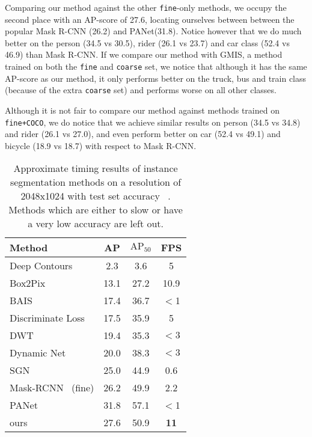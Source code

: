 Comparing our method against the other \texttt{fine}-only methods, we occupy the second place with an AP-score of 27.6, locating ourselves between between the popular Mask R-CNN (26.2) and PANet(31.8). Notice however that we do much better on the person (34.5 vs 30.5), rider (26.1 vs 23.7) and car class (52.4 vs 46.9) than Mask R-CNN. If we compare our method with GMIS, a method trained on both the \texttt{fine} and \texttt{coarse} set, we notice that although it has the same AP-score as our method, it only performs better on the truck, bus and train class (because of the extra \texttt{coarse} set) and performs worse on all other classes. 

Although it is not fair to compare our method against methods trained on \texttt{fine+COCO}, we do notice that we achieve similar results on person (34.5 vs 34.8) and rider (26.1 vs 27.0), and even perform better on car (52.4 vs 49.1) and bicycle (18.9 vs 18.7) with respect to Mask R-CNN.

\begin{table}
    \small
    \centering
    \begin{tabular}{l|c|c|c}
        Method & AP & $\text{AP}_{50}$ & FPS \\
        \hline 
        Deep Contours~\cite{van2016instance}     & 2.3  & 3.6  & 5 \\
        Box2Pix~\cite{uhrig2018box2pix}          & 13.1 & 27.2 & 10.9 \\
        BAIS~\cite{hayder2017boundary}           & 17.4 & 36.7 & $<$1 \\
        Discriminate Loss~\cite{de2017semantic}  & 17.5 & 35.9 & 5 \\
        DWT~\cite{bai2017deep}                   & 19.4 & 35.3 & $<3$ \\
        Dynamic Net~\cite{arnab2017pixelwise}    & 20.0 & 38.3 & $<3$ \\
        SGN~\cite{liu2017sgn}                    & 25.0 & 44.9 & 0.6 \\
        Mask-RCNN~\cite{he2017mask} (fine)       & 26.2 & 49.9 & 2.2 \\
        PANet~\cite{liu2018path}                 & 31.8 & 57.1 & $<$1 \\
        \hline
        ours                                     & 27.6 & 50.9 & \textbf{11} \\
    \end{tabular}
    \vspace{3mm}
    \caption{Approximate timing results of instance segmentation methods on a resolution of 2048x1024 with test set accuracy ~\cite{uhrig2018box2pix}. Methods which are either to slow or have a very low accuracy are left out.}
    \label{tab:timing_results}
\end{table}

